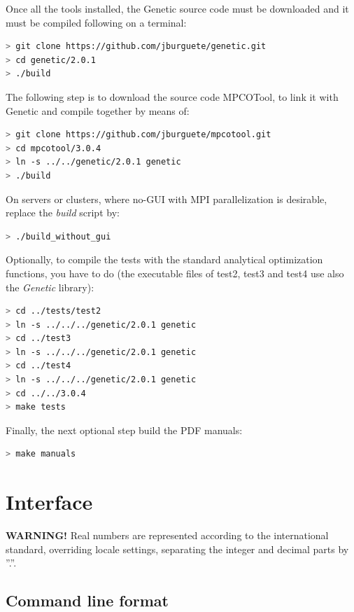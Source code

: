 \documentclass[a4paper]{report}
\begin{document}
Once all the tools installed, the Genetic source code must be downloaded and it must be compiled following on a terminal:
\begin{lstlisting}[language=bash,basicstyle=\scriptsize]
> git clone https://github.com/jburguete/genetic.git
> cd genetic/2.0.1
> ./build
\end{lstlisting}

The following step is to download the source code MPCOTool, to link it with Genetic and compile together by means of:
\begin{lstlisting}[language=bash,basicstyle=\scriptsize]
> git clone https://github.com/jburguete/mpcotool.git
> cd mpcotool/3.0.4
> ln -s ../../genetic/2.0.1 genetic
> ./build
\end{lstlisting}

On servers or clusters, where no-GUI with MPI parallelization is desirable,
replace the \emph{build} script by:
\begin{lstlisting}[language=bash,basicstyle=\scriptsize]
> ./build_without_gui
\end{lstlisting}
 
Optionally, to compile the tests with the standard analytical optimization
functions, you have to do (the executable files of test2, test3 and test4 use
also the \emph{Genetic} library):
\begin{lstlisting}[language=bash,basicstyle=\scriptsize]
> cd ../tests/test2
> ln -s ../../../genetic/2.0.1 genetic
> cd ../test3
> ln -s ../../../genetic/2.0.1 genetic
> cd ../test4
> ln -s ../../../genetic/2.0.1 genetic
> cd ../../3.0.4
> make tests
\end{lstlisting}

Finally, the next optional step build the PDF manuals:
\begin{lstlisting}[language=bash,basicstyle=\scriptsize]
> make manuals
\end{lstlisting}

\chapter{Interface}

{\bf WARNING!} Real numbers are represented according to the international
standard, overriding locale settings, separating the integer and decimal parts
by ''.''.

\section{Command line format}
\end{document}
